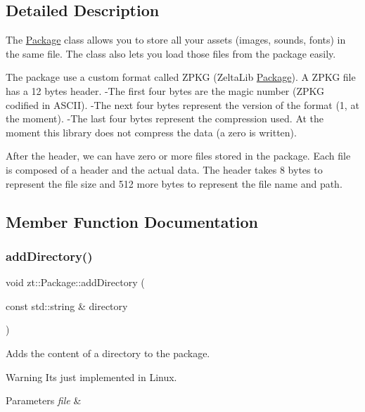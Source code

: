 \subsection{Detailed Description}
The \hyperlink{classzt_1_1_package}{Package} class allows you to store all your assets (images, sounds, fonts) in the same file. The class also lets you load those files from the package easily. 

The package use a custom format called Z\+P\+KG (Zelta\+Lib \hyperlink{classzt_1_1_package}{Package}). A Z\+P\+KG file has a 12 bytes header. -\/\+The first four bytes are the magic number (Z\+P\+KG codified in A\+S\+C\+II). -\/\+The next four bytes represent the version of the format (1, at the moment). -\/\+The last four bytes represent the compression used. At the moment this library does not compress the data (a zero is written).

After the header, we can have zero or more files stored in the package. Each file is composed of a header and the actual data. The header takes 8 bytes to represent the file size and 512 more bytes to represent the file name and path. 

\subsection{Member Function Documentation}
\mbox{\label{classzt_1_1_package_a6f528593a7a56b9d2c7ec6df0a6b2bb2}} 
\subsubsection{\texorpdfstring{add\+Directory()}{addDirectory()}}
{\footnotesize\ttfamily void zt\+::\+Package\+::add\+Directory (\begin{DoxyParamCaption}\item[{const std\+::string \&}]{directory }\end{DoxyParamCaption})}



Adds the content of a directory to the package. 

\begin{DoxyWarning}{Warning}
It\textquotesingle{}s just implemented in Linux. 
\end{DoxyWarning}

\begin{DoxyParams}{Parameters}
{\em file} & \\
\hline
\end{DoxyParams}
\mbox{\label{classzt_1_1_package_a5410213f58e0f08e648d6424474e0a5d}} 
